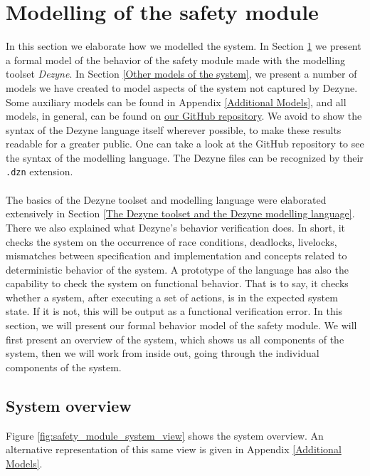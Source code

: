 \documentclass[12pt]{scrreprt}
\begin{document}
\newpage
\section{Modelling of the safety module}
\label{Formal model of the behavior of the system}
In this section we elaborate how we modelled the system. In Section \ref{Formal model of the behavior of the system} we present a formal model of the behavior of the safety module made with the modelling toolset \textit{Dezyne}. In Section \ref{Other models of the system}, we present a number of models we have created to model aspects of the system not captured by Dezyne. Some auxiliary models can be found in Appendix \ref{Additional Models}, and all models, in general, can be found on \href{https://github.com/Yousousen/safety-module-for-care-robot-rose.git}{our GitHub repository}. We avoid to show the syntax of the Dezyne language itself wherever possible, to make these results readable for a greater public. One can take a look at the GitHub repository to see the syntax of the modelling language. The Dezyne files can be recognized by their \texttt{.dzn} extension.
\\\\
The basics of the Dezyne toolset and modelling language were elaborated extensively in Section \ref{The Dezyne toolset and the Dezyne modelling language}. There we also explained what Dezyne's behavior verification does. In short, it checks the system on the occurrence of race conditions, deadlocks, livelocks, mismatches between specification and implementation and concepts related to deterministic behavior of the system. A prototype of the language has also the capability to check the system on functional behavior. That is to say, it checks whether a system, after executing a set of actions, is in the expected system state. If it is not, this will be output as a functional verification error. In this section, we will present our formal behavior model of the safety module. We will first present an overview of the system, which shows us all components of the system, then we will work from inside out, going through the individual components of the system.
\subsection{System overview}
\label{System overview}
Figure \ref{fig:safety_module_system_view} shows the system overview. An alternative representation of this same view is given in Appendix \ref{Additional Models}.
\end{document}
